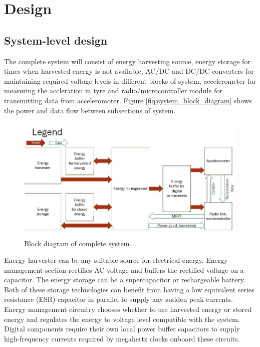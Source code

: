 \section{Design}

\subsection{System-level design}
The complete system will consist of energy harvesting source, energy storage for times when harvested energy is not available, AC/DC and DC/DC converters for maintaining required voltage levels in different blocks of system, accelerometer for measuring the accleration in tyre and radio/microcontroller module for transmitting data from acceleromoter. Figure \ref{fiq:system_block_diagram} shows the power and data flow between subsections of system. 


\begin{figure}[htb]
\begin{center}
\includegraphics[height=6cm]{images/own_dwg/system_block_diagram.jpg}
\end{center}
\caption{\label{fiq:system_block_diagram} Block diagram of complete system.}
\label{liitekuva}
\end{figure}

Energy harvester can be any suitable source for electrical energy. Energy management section rectifies AC voltage and buffers the rectified voltage on a capacitor. The energy storage can be a supercapacitor or rechargeable battery. Both of these storage technologies can benefit from having a low equivalent series resistance (ESR) capacitor in parallel to supply any sudden peak currents. Energy management circuitry chooses whether to use harvested energy or stored energy and regulates the energy to voltage level compatible with the system. Digital components require their own local power buffer capacitors to supply high-frequency currents required by megahertz clocks onboard these circuits.

